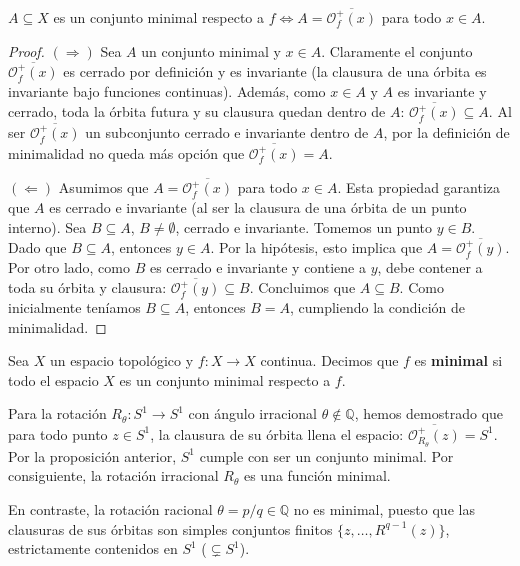 \begin{proposicion}
	$A \subseteq X$ es un conjunto minimal respecto a $f \iff A = \overline{\mathcal{O}_f^+(x)}$ para todo $x \in A$.
\end{proposicion}
\begin{proof}
	$(\Rightarrow)$ Sea $A$ un conjunto minimal y $x \in A$. 
	Claramente el conjunto $\overline{\mathcal{O}_f^+(x)}$ es cerrado por definición y es invariante (la clausura de una órbita es invariante bajo funciones continuas).
	Además, como $x \in A$ y $A$ es invariante y cerrado, toda la órbita futura y su clausura quedan dentro de $A$: $\overline{\mathcal{O}_f^+(x)} \subseteq A$.
	Al ser $\overline{\mathcal{O}_f^+(x)}$ un subconjunto cerrado e invariante dentro de $A$, por la definición de minimalidad no queda más opción que $\overline{\mathcal{O}_f^+(x)} = A$.
	
	$(\Leftarrow)$ Asumimos que $A = \overline{\mathcal{O}_f^+(x)}$ para todo $x \in A$. Esta propiedad garantiza que $A$ es cerrado e invariante (al ser la clausura de una órbita de un punto interno).
	Sea $B \subseteq A$, $B \neq \emptyset$, cerrado e invariante.
	Tomemos un punto $y \in B$. Dado que $B \subseteq A$, entonces $y \in A$. Por la hipótesis, esto implica que $A = \overline{\mathcal{O}_f^+(y)}$.
	Por otro lado, como $B$ es cerrado e invariante y contiene a $y$, debe contener a toda su órbita y clausura: $\overline{\mathcal{O}_f^+(y)} \subseteq B$.
	Concluimos que $A \subseteq B$. Como inicialmente teníamos $B \subseteq A$, entonces $B = A$, cumpliendo la condición de minimalidad.
\end{proof}

\begin{definicion}
	Sea $X$ un espacio topológico y $f: X \to X$ continua. Decimos que $f$ es \textbf{minimal} si todo el espacio $X$ es un conjunto minimal respecto a $f$.
\end{definicion}

\begin{ejemplo}
	Para la rotación $R_\theta: S^1 \to S^1$ con ángulo irracional $\theta \notin \mathbb{Q}$, hemos demostrado que para todo punto $z \in S^1$, la clausura de su órbita llena el espacio: $\overline{\mathcal{O}_{R_\theta}^+(z)} = S^1$. 
	Por la proposición anterior, $S^1$ cumple con ser un conjunto minimal. Por consiguiente, la rotación irracional $R_\theta$ es una función minimal.
	
	En contraste, la rotación racional $\theta = p/q \in \mathbb{Q}$ no es minimal, puesto que las clausuras de sus órbitas son simples conjuntos finitos $\{z, \dots, R^{q-1}(z)\}$, estrictamente contenidos en $S^1$ ($\subsetneq S^1$).
\end{ejemplo}

